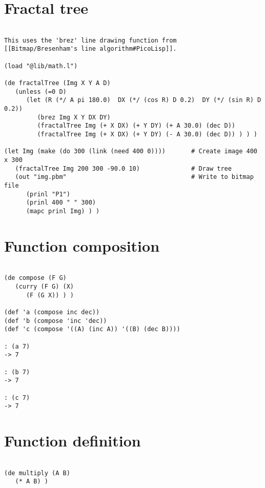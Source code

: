 \section*{Fractal tree}

\begin{verbatim}

This uses the 'brez' line drawing function from
[[Bitmap/Bresenham's line algorithm#PicoLisp]].

(load "@lib/math.l")

(de fractalTree (Img X Y A D)
   (unless (=0 D)
      (let (R (*/ A pi 180.0)  DX (*/ (cos R) D 0.2)  DY (*/ (sin R) D 0.2))
         (brez Img X Y DX DY)
         (fractalTree Img (+ X DX) (+ Y DY) (+ A 30.0) (dec D))
         (fractalTree Img (+ X DX) (+ Y DY) (- A 30.0) (dec D)) ) ) )

(let Img (make (do 300 (link (need 400 0))))       # Create image 400 x 300
   (fractalTree Img 200 300 -90.0 10)              # Draw tree
   (out "img.pbm"                                  # Write to bitmap file
      (prinl "P1")
      (prinl 400 " " 300)
      (mapc prinl Img) ) )

\end{verbatim}

\section*{Function composition}

\begin{verbatim}

(de compose (F G)
   (curry (F G) (X)
      (F (G X)) ) )

(def 'a (compose inc dec))
(def 'b (compose 'inc 'dec))
(def 'c (compose '((A) (inc A)) '((B) (dec B))))

: (a 7)
-> 7

: (b 7)
-> 7

: (c 7)
-> 7

\end{verbatim}

\section*{Function definition}

\begin{verbatim}

(de multiply (A B)
   (* A B) )

\end{verbatim}

